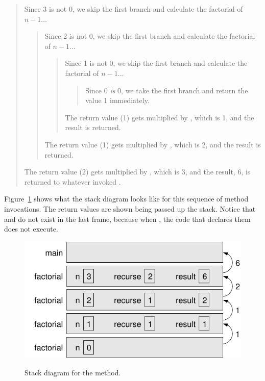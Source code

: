\vspace{-1ex}
\begin{quote}
Since 3 is not 0, we skip the first branch and calculate the factorial of $n-1$...
\begin{quote}
Since 2 is not 0, we skip the first branch and calculate the factorial of $n-1$...
\begin{quote}
Since 1 is not 0, we skip the first branch and calculate the factorial of $n-1$...
\begin{quote}
Since 0 {\em is} 0, we take the first branch and return the value 1 immediately.
\end{quote}
The return value (1) gets multiplied by , which is 1, and the result is returned.
\end{quote}
The return value (1) gets multiplied by , which is 2, and the result is returned.
\end{quote}
The return value (2) gets multiplied by , which is 3, and the result, 6, is returned to whatever invoked .
\end{quote}
\vspace{-1ex}


Figure~\ref{fig.stack3} shows what the stack diagram looks like for this sequence of method invocations.
The return values are shown being passed up the stack.
Notice that  and  do not exist in the last frame, because when , the code that declares them does not execute.

\begin{figure}[!ht]
\begin{center}
\includegraphics[alt={Stack diagram showing the call stack for factorial method with frames showing parameter n and return values being passed up the stack}]{figs/stack3.pdf}
\caption{Stack diagram for the  method.}
\label{fig.stack3}
\end{center}
\end{figure}



